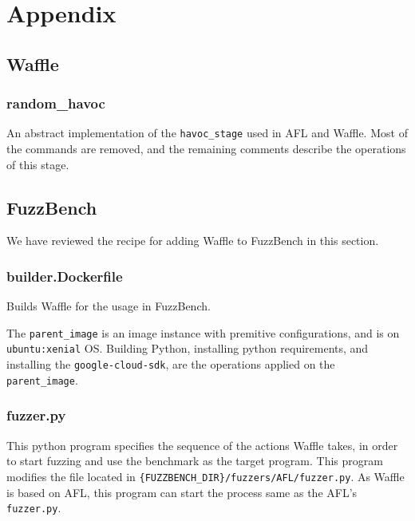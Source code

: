 \chapter{Appendix}

\begin{subappendices}
    \section{Waffle}
    \label{app:waffle}
    
    \subsection{random\_havoc}
    \label{app:havoc}
    An abstract implementation of the \texttt{havoc\_stage} used in AFL and Waffle. Most of the commands are removed, and the remaining comments describe the operations of this stage.
        

\newpage
    \section{FuzzBench}
    \label{app:fuzzbench}

    We have reviewed the recipe for adding Waffle to FuzzBench in this section.

    \subsection{builder.Dockerfile}
    \label{app:builder.docker}
    Builds Waffle for the usage in FuzzBench.

    The \texttt{parent\_image} is an image instance with premitive configurations, and is on \texttt{ubuntu:xenial} OS. Building Python, installing python requirements, and installing the \texttt{google-cloud-sdk}, are the operations applied on the \texttt{parent\_image}.

    

    \subsection{fuzzer.py}
    \label{app:fuzzer.py}
    This python program specifies the sequence of the actions Waffle takes, in order to start fuzzing and use the benchmark as the target program. This program modifies the file located in \texttt{\{FUZZBENCH\_DIR\}/fuzzers/AFL/fuzzer.py}. As Waffle is based on AFL, this program can start the process same as the AFL's \texttt{fuzzer.py}.

    


\end{subappendices}